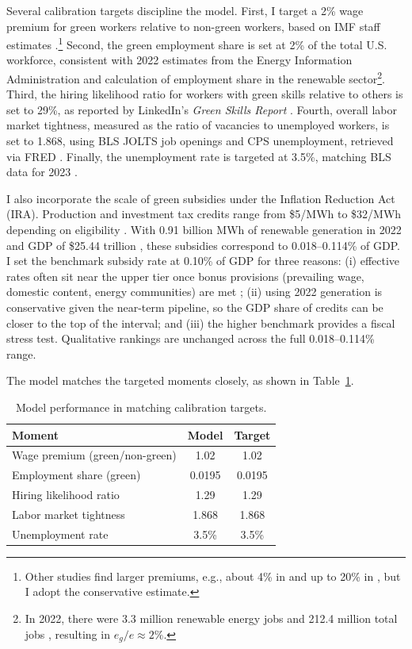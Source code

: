 \documentclass[preprint,12pt]{elsarticle}
\begin{document}
Several calibration targets discipline the model. First, I target a 2\% wage premium for green workers relative to non-green workers, based on IMF staff estimates \citep{imf2022}.\footnote{Other studies find larger premiums, e.g., about 4\% in \citet{voxeu2023} and up to 20\% in \citet{curtis2022green}, but I adopt the conservative estimate.} Second, the green employment share is set at 2\% of the total U.S. workforce, consistent with 2022 estimates from the Energy Information Administration \citep{eia2024} and calculation of employment share in the renewable sector\footnote{In 2022, there were 3.3 million renewable energy jobs \citep{E2CleanJobs2023} and 212.4 million total jobs \citep{BEA_SAEMP25N_2024}, resulting in $e_g/e \approx 2\%$.}. Third, the hiring likelihood ratio for workers with green skills relative to others is set to 29\%, as reported by LinkedIn’s \emph{Green Skills Report} \citep{LinkedInGreenSkillsReport}. Fourth, overall labor market tightness, measured as the ratio of vacancies to unemployed workers, is set to 1.868, using BLS JOLTS job openings and CPS unemployment, retrieved via FRED \citep{BLS_JTSJOL,BLS_UNEMPLOY}. Finally, the unemployment rate is targeted at 3.5\%, matching BLS data for 2023 \citep{bls2023}.  

I also incorporate the scale of green subsidies under the Inflation Reduction Act (IRA). Production and investment tax credits range from \$5/MWh to \$32/MWh depending on eligibility \citep{bushnell2024modeling}. With 0.91 billion MWh of renewable generation in 2022 \citep{doe2023} and GDP of \$25.44 trillion \citep{worldbank2022}, these subsidies correspond to 0.018--0.114\% of GDP. I set the benchmark subsidy rate at 0.10\% of GDP for three reasons: (i) effective rates often sit near the upper tier once bonus provisions (prevailing wage, domestic content, energy communities) are met \citep{bushnell2024modeling}; (ii) using 2022 generation is conservative given the near-term pipeline, so the GDP share of credits can be closer to the top of the interval; and (iii) the higher benchmark provides a fiscal stress test. Qualitative rankings are unchanged across the full 0.018--0.114\% range.

\noindent The model matches the targeted moments closely, as shown in Table~\ref{tab:targets}.  

\begin{table}[H]
\centering
\begin{tabular}{lcc}
\hline
\textbf{Moment} & \textbf{Model} & \textbf{Target} \\
\hline
Wage premium (green/non-green) & 1.02 & 1.02 \\
Employment share (green)       & 0.0195 & 0.0195 \\
Hiring likelihood ratio         & 1.29 & 1.29 \\
Labor market tightness          & 1.868 & 1.868 \\
Unemployment rate               & 3.5\% & 3.5\% \\
\hline
\end{tabular}
\caption{Model performance in matching calibration targets.}
\label{tab:targets}
\end{table}
\end{document}
